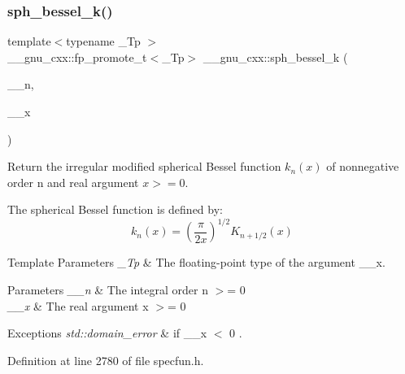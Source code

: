 \subsubsection{\texorpdfstring{sph\+\_\+bessel\+\_\+k()}{sph\_bessel\_k()}}
{\footnotesize\ttfamily template$<$typename \+\_\+\+Tp $>$ \\
\+\_\+\+\_\+gnu\+\_\+cxx\+::fp\+\_\+promote\+\_\+t$<$\+\_\+\+Tp$>$ \+\_\+\+\_\+gnu\+\_\+cxx\+::sph\+\_\+bessel\+\_\+k (\begin{DoxyParamCaption}\item[{unsigned int}]{\+\_\+\+\_\+n,  }\item[{\+\_\+\+Tp}]{\+\_\+\+\_\+x }\end{DoxyParamCaption})\hspace{0.3cm}{\ttfamily [inline]}}

Return the irregular modified spherical Bessel function $ k_n(x) $ of nonnegative order n and real argument $ x >= 0 $.

The spherical Bessel function is defined by\+: \[ k_n(x) = \left(\frac{\pi}{2x} \right) ^{1/2} K_{n+1/2}(x) \]


\begin{DoxyTemplParams}{Template Parameters}
{\em \+\_\+\+Tp} & The floating-\/point type of the argument {\ttfamily \+\_\+\+\_\+x}. \\
\hline
\end{DoxyTemplParams}

\begin{DoxyParams}{Parameters}
{\em \+\_\+\+\_\+n} & The integral order {\ttfamily  n $>$= 0 } \\
\hline
{\em \+\_\+\+\_\+x} & The real argument {\ttfamily  x $>$= 0 } \\
\hline
\end{DoxyParams}

\begin{DoxyExceptions}{Exceptions}
{\em std\+::domain\+\_\+error} & if {\ttfamily  \+\_\+\+\_\+x $<$ 0 }. \\
\hline
\end{DoxyExceptions}


Definition at line 2780 of file specfun.\+h.

\mbox{\label{group__gnu__math__spec__func_gaf886e8f8dfd2af0c4a9c5929d193d12f}} 
